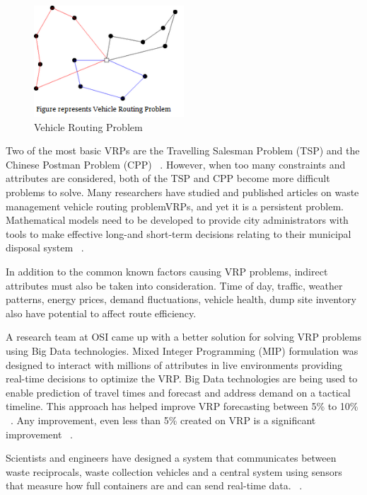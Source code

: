 \documentclass[sigconf]{acmart}
\begin{document}
\begin{figure}[ht!]
  \includegraphics[width=0.5\textwidth]{vrp.png}
  \caption{Vehicle Routing Problem}
\end{figure}

Two of the most basic VRPs are the Travelling Salesman Problem (TSP) and the Chinese Postman Problem (CPP) ~\cite{belien2012}. However, when too many constraints and attributes are considered, both of the TSP and CPP become more difficult problems to solve. Many researchers have studied and published articles on waste management vehicle routing problemVRPs, and yet it is a persistent problem. Mathematical models need to be developed to provide city administrators with tools to make effective long-and short-term decisions relating to their municipal disposal system ~\cite{bhat1996}. 

In addition to the common known factors causing VRP problems, indirect attributes must also be taken into consideration.  Time of day, traffic, weather patterns, energy prices, demand fluctuations, vehicle health, dump site inventory also have potential to affect route efficiency. 

A research team at OSI came up with a better solution for solving VRP problems using Big Data technologies. Mixed Integer Programming (MIP) formulation was designed to interact with millions of attributes in live environments providing real-time decisions to optimize the VRP. Big Data technologies are being used to enable prediction of travel times and forecast and address demand on a tactical timeline. This approach has helped improve VRP forecasting between  5\% to 10\% ~\cite{vijay2013}. Any improvement, even less than 5\% created on VRP is a significant improvement ~\cite{hasle2007}.

Scientists and engineers have designed a system that communicates between waste reciprocals, waste collection vehicles and a central system using sensors that measure how full containers are and can send real-time data.  ~\cite{faccio2011}.
\end{document}
